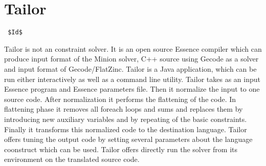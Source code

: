 \section{Tailor}
\label{tailor}
\verb= $Id$ =

Tailor is not an constraint solver. It is an open source Essence compiler which can produce input
format of the Minion solver, C++ source using Gecode as a solver and input format of Gecode/FlatZinc.
Tailor is a Java application, which can be run either interactively as well as a
command line utility. Tailor takes as an input Essence program and Essence parameters file.
Then it normalize the input to one source code. After normalization it performs the 
flattening of the code. In flattening phase it removes all foreach loops and sums
and replaces them by introducing new auxiliary variables and by repeating of the 
basic constraints. Finally it transforms this normalized code to the destination
language. Tailor offers tuning the output code by setting several parameters about
the language coonstruct which can be used. Tailor offers directly run the solver
from its environment on the translated source code.